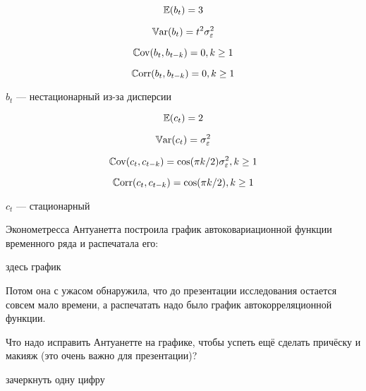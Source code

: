 \begin{problem}
\begin{sol}

\[
\operatorname{\mathbb{E}}(b_t) = 3
\]

\[
\operatorname{\mathbb{V}\mathrm{ar}}(b_t) = t^2 \sigma^2_{\varepsilon}
\]

\[
\operatorname{\mathbb{C}\mathrm{ov}}(b_t, b_{t-k}) = 0, k \geq 1
\]

\[
\operatorname{\mathbb{C}\mathrm{orr}}(b_t, b_{t-k}) = 0, k \geq 1
\]

$b_t$ — нестационарный из-за дисперсии


\[
\operatorname{\mathbb{E}}(c_t) = 2
\]

\[
\operatorname{\mathbb{V}\mathrm{ar}}(c_t) = \sigma^2_{\varepsilon}
\]

\[
\operatorname{\mathbb{C}\mathrm{ov}}(c_t, c_{t-k}) = \cos( \pi k /2)\sigma^2_{\varepsilon}, k \geq 1
\]

\[
\operatorname{\mathbb{C}\mathrm{orr}}(c_t, c_{t-k}) = \cos( \pi k /2), k \geq 1
\]

$c_t$ — стационарный
\end{sol}
\end{problem}





\begin{problem}
Эконометресса Антуанетта построила график автоковариационной функции временного ряда и распечатала его:

здесь график

Потом она с ужасом обнаружила, что до презентации исследования остается совсем мало времени, 
а распечатать надо было график автокорреляционной функции. 

Что надо исправить Антуанетте на графике, чтобы успеть ещё сделать причёску и макияж (это очень важно для презентации)?



\begin{sol}
зачеркнуть одну цифру
\end{sol}
\end{problem}


